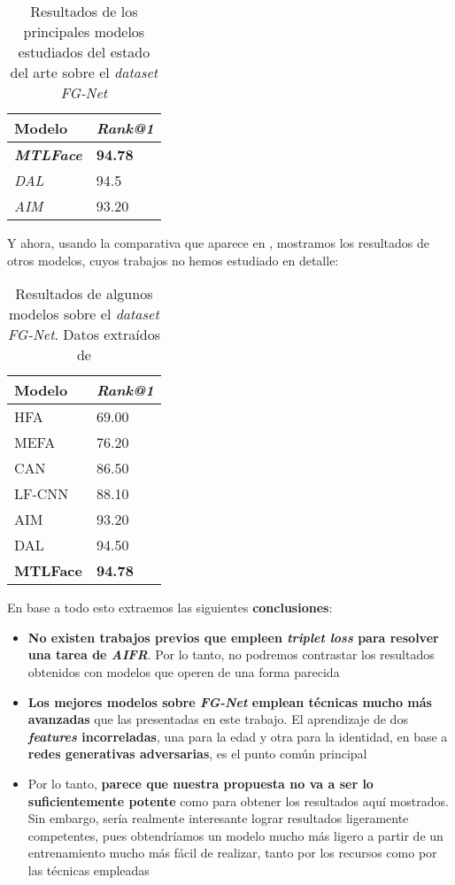 \begin{table}[H]
\centering
\begin{tabular}{|l|l|}
    \hline
    Modelo & \textit{Rank@1} \\
    \hline

    \textbf{\textit{MTLFace}} & \textbf{94.78} \\
    \textit{DAL} & 94.5 \\
    \textit{AIM} & 93.20 \\
    \hline

\end{tabular}
\caption{Resultados de los principales modelos estudiados del estado del arte sobre el \textit{dataset} \textit{FG-Net}}
\end{table}

Y ahora, usando la comparativa que aparece en \cite{informatica:best_fgnet_model}, mostramos los resultados de otros modelos, cuyos trabajos no hemos estudiado en detalle:

\begin{table}[H]
\centering
\begin{tabular}{|l|l|}
    \hline
    Modelo & \textit{Rank@1} \\
    \hline
    HFA & 69.00 \\
    MEFA & 76.20 \\
    CAN & 86.50 \\
    LF-CNN & 88.10 \\
    AIM & 93.20 \\
    DAL & 94.50 \\
    \textbf{MTLFace} & \textbf{94.78} \\
    \hline
\end{tabular}
\caption{Resultados de algunos modelos sobre el \textit{dataset} \textit{FG-Net}. Datos extraídos de \cite{informatica:best_fgnet_model}}
\end{table}

En base a todo esto extraemos las siguientes \textbf{conclusiones}:

\begin{itemize}
    \item \textbf{No existen trabajos previos que empleen \textit{triplet loss} para resolver una tarea de \textit{AIFR}}. Por lo tanto, no podremos contrastar los resultados obtenidos con modelos que operen de una forma parecida
    \item \textbf{Los mejores modelos sobre \textit{FG-Net} emplean técnicas mucho más avanzadas} que las presentadas en este trabajo. El aprendizaje de dos \textbf{\textit{features} incorreladas}, una para la edad y otra para la identidad, en base a \textbf{redes generativas adversarias}, es el punto común principal
    \item Por lo tanto, \textbf{parece que nuestra propuesta no va a ser lo suficientemente potente} como para obtener los resultados aquí mostrados. Sin embargo, sería realmente interesante lograr resultados ligeramente competentes, pues obtendríamos un modelo mucho más ligero a partir de un entrenamiento mucho más fácil de realizar, tanto por los recursos como por las técnicas empleadas
\end{itemize}
